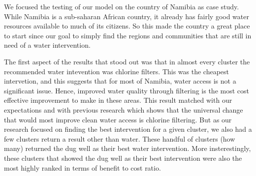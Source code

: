 We focused the testing of our model on the country of Namibia as case study.
While Namibia is a sub-saharan African country, it already has fairly good water resources available to much of its citizens.
So this made the country a great place to start since our goal to simply find the regions and communities that are still in need of a water intervention.  

The first aspect of the results that stood out was that in almost every cluster the recommended water intevention was chlorine filters.
This was the cheapest intervetion, and this suggests that for most of Namibia, water access is not a significant issue.
Hence, improved water quality through filtering is the most cost effective improvement to make in these areas.
This result matched with our expectations and with previous research which shows that the universal change that would most improve clean water access is chlorine filtering.
But as our research focused on finding the best intervention for a given cluster, we also had a few clusters return a result other than water.
These handful of clusters (how many) returned the dug well as their best water intervention.
More insterestingly, these clusters that showed the dug well as their best intervention were also the most highly ranked in terms of benefit to cost ratio.
